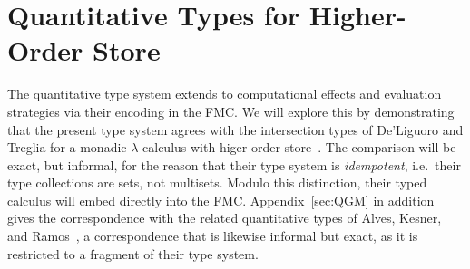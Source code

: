 \documentclass[a4paper,UKenglish,cleveref, autoref, thm-restate]{lipics-v2021}
\begin{document}
\section{Quantitative Types for Higher-Order Store}
\label{sec:store}

The quantitative type system extends to computational effects and evaluation strategies via their encoding in the FMC. We will explore this by demonstrating that the present type system agrees with the intersection types of De'Liguoro and Treglia for a monadic $\lambda$-calculus with higer-order store~\cite{deLiguoro-Treglia-2021}. The comparison will be exact, but informal, for the reason that their type system is \emph{idempotent}, i.e.\ their type collections are sets, not multisets. Modulo this distinction, their typed calculus will embed directly into the FMC. Appendix~\ref{sec:QGM} in addition gives the correspondence with the related quantitative types of Alves, Kesner, and Ramos~\cite{Alves-Kesner-Ramos-2023}, a correspondence that is likewise informal but exact, as it is restricted to a fragment of their type system.
\end{document}
